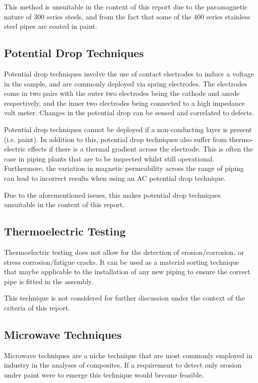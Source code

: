 \documentclass[a4paper,twoside,11pt]{article}
\begin{document}
This method is unsuitable in the context of this report due to the paramagnetic nature of 300 series steels, and from the fact that some of the 400 series stainless steel pipes are coated in paint.

\subsection{Potential Drop Techniques}

Potential drop techniques involve the use of contact electrodes to induce a voltage in the sample, and are commonly deployed via spring electrodes. The electrodes come in two pairs with the outer two electrodes being the cathode and anode respectively, and the inner two electrodes being connected to a high impedance volt meter. Changes in the potential drop can be sensed and correlated to defects. 


Potential drop techniques cannot be deployed if a non-conducting layer is present (i.e. paint).
In addition to this, potential drop techniques also suffer from thermo-electric effects if there is a thermal gradient across the electrode. 
This is often the case in piping plants that are to be inspected whilst still operational. 
Furthermore, the variation in magnetic permeability across the range of piping can lead to incorrect results when using an AC potential drop technique.

Due to the aforementioned issues, this makes potential drop techniques unsuitable in the context of this report.

\subsection{Thermoelectric Testing}

Thermoelectric testing does not allow for the detection of erosion/corrosion, or stress corrosion/fatigue cracks. 
It can be used as a material sorting technique that maybe applicable to the installation of any new piping to ensure the correct pipe is fitted in the assembly.

This technique is not considered for further discussion under the context of the criteria of this report.

\subsection{Microwave Techniques}

Microwave techniques are a niche technique that are most commonly employed in industry in the analyses of composites. 
If a requirement to detect only erosion under paint were to emerge this technique would become feasible. 
\end{document}
